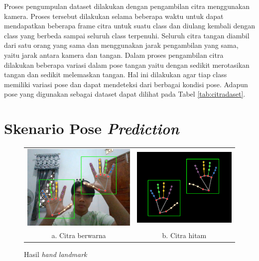 Proses pengumpulan dataset dilakukan dengan pengambilan citra menggunakan kamera. Proses tersebut dilakukan selama beberapa waktu untuk dapat mendapatkan beberapa frame citra untuk suatu class dan diulang kembali dengan class yang berbeda sampai seluruh class terpenuhi. Seluruh citra tangan diambil dari satu orang yang sama dan menggunakan jarak pengambilan yang sama, yaitu jarak antara kamera dan tangan. Dalam proses pengambilan citra dilakukan beberapa variasi dalam pose tangan yaitu dengan sedikit merotasikan tangan dan sedikit melemaskan tangan. Hal ini dilakukan agar tiap class memiliki variasi pose dan dapat mendeteksi dari berbagai kondisi pose. Adapun pose yang digunakan sebagai dataset dapat dilihat pada Tabel \ref{tab:citradaset}.



\section{Skenario Pose \emph{Prediction}}

\begin{figure}[H]
  \centering
  \begin{tabular}{cc}
    \includegraphics[width=0.4\linewidth]{../Gambar/hasilposepred.jpg} & \includegraphics[width=0.4\linewidth]{../Gambar/hasilposepredhitam.png} \\
    a. Citra berwarna & b. Citra hitam 
    \end{tabular}
    \caption{Hasil\emph{ hand landmark}}
  \label{fig:hasilposepred}
\end{figure}

